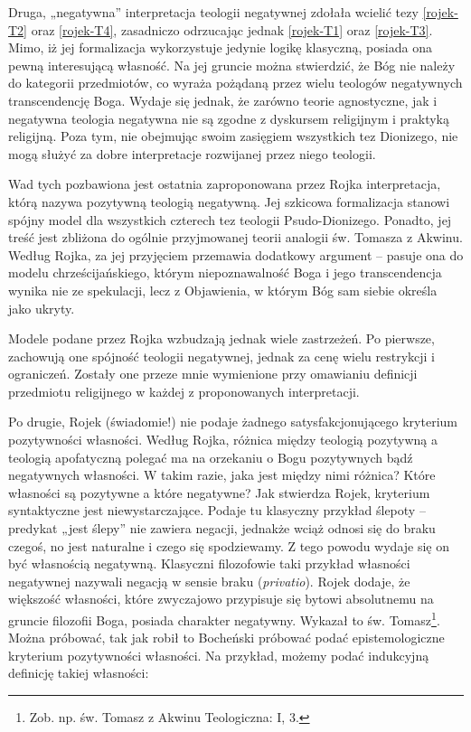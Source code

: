 Druga, „negatywna” interpretacja teologii negatywnej zdołała wcielić
tezy \eqref{rojek-T2} oraz \eqref{rojek-T4}, zasadniczo odrzucając jednak \eqref{rojek-T1} oraz \eqref{rojek-T3}. Mimo,
iż jej formalizacja wykorzystuje jedynie logikę klasyczną, posiada ona
pewną interesującą własność. Na jej gruncie można stwierdzić, że Bóg
nie należy do kategorii przedmiotów, co wyraża pożądaną przez wielu
teologów negatywnych transcendencję Boga. Wydaje się jednak, że zarówno
teorie agnostyczne, jak i negatywna teologia negatywna nie są zgodne z
dyskursem religijnym i praktyką religijną. Poza tym, nie obejmując
swoim zasięgiem wszystkich tez Dionizego, nie mogą służyć za dobre
interpretacje rozwijanej przez niego teologii.

Wad tych pozbawiona jest ostatnia zaproponowana przez Rojka
interpretacja, którą nazywa pozytywną teologią negatywną. Jej szkicowa
formalizacja stanowi spójny model dla wszystkich czterech tez teologii
Psudo-Dionizego. Ponadto, jej treść jest zbliżona do ogólnie
przyjmowanej teorii analogii św. Tomasza z Akwinu. Według Rojka, za jej
przyjęciem przemawia dodatkowy argument -- pasuje ona do modelu
chrześcijańskiego, którym niepoznawalność Boga i jego transcendencja
wynika nie ze spekulacji, lecz z Objawienia, w którym Bóg sam siebie
określa jako ukryty.

Modele podane przez Rojka wzbudzają jednak wiele zastrzeżeń. Po
pierwsze, zachowują one spójność teologii negatywnej, jednak za cenę
wielu restrykcji i ograniczeń. Zostały one przeze mnie wymienione przy
omawianiu definicji przedmiotu religijnego w każdej z proponowanych
interpretacji.

Po drugie, Rojek (świadomie!) nie podaje żadnego satysfakcjonującego
kryterium pozytywności własności. Według Rojka, różnica między teologią
pozytywną a teologią apofatyczną polegać ma na orzekaniu o Bogu
pozytywnych bądź negatywnych własności. W takim razie, jaka jest między
nimi różnica? Które własności są pozytywne a które negatywne? Jak
stwierdza Rojek, kryterium syntaktyczne jest niewystarczające. Podaje
tu klasyczny przykład ślepoty -- predykat „jest ślepy” nie zawiera
negacji, jednakże wciąż odnosi się do braku czegoś, no jest naturalne i
czego się spodziewamy. Z tego powodu wydaje się on być własnością
negatywną. Klasyczni filozofowie taki przykład własności negatywnej
nazywali negacją w sensie braku (\textit{privatio}). Rojek dodaje, że
większość własności, które zwyczajowo przypisuje się bytowi absolutnemu
na gruncie filozofii Boga, posiada charakter negatywny. Wykazał to św.
Tomasz\footnote{Zob. np. św. Tomasz z Akwinu Teologiczna: I, 3. }.
Można próbować, tak jak robił to Bocheński próbować podać
epistemologiczne kryterium pozytywności własności. Na przykład, możemy
podać indukcyjną definicję takiej własności:

